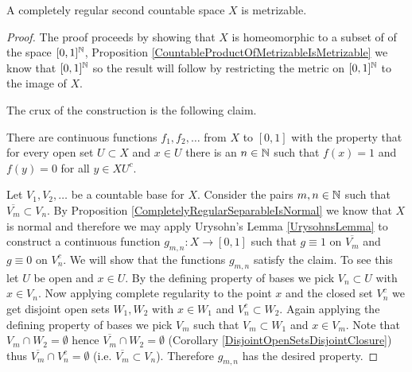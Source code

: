 \begin{thm}\label{UrysohnMetrization}A completely regular second countable space $X$ is metrizable.
\end{thm}
\begin{proof}
The proof proceeds by showing that $X$ is homeomorphic to a subset of of the space $[0,1]^{\mathbb{N}}$,   Proposition \ref{CountableProductOfMetrizableIsMetrizable} we know that $[0,1]^{\mathbb{N}}$
so the result will follow by restricting the metric on $[0,1]^{\mathbb{N}}$ to the image of $X$.

The crux of the construction is the following claim.
\begin{clm}There are continuous functions $f_1, f_2, \dotsc$ from $X$ to $[0,1]$ with the property that for every open set $U \subset X$  and $x \in U$ there is an $n \in \mathbb{N}$ such that $f(x) =1$ and $f(y) = 0$ for all $y \in X U^c$.
\end{clm}
Let $V_1, V_2, \dotsc$ be a countable base for $X$.  Consider the pairs $m,n \in \mathbb{N}$ such that $\overline{V_m} \subset V_n$.  By Proposition \ref{CompletelyRegularSeparableIsNormal} we know that $X$ is normal and therefore we may apply Urysohn's Lemma  \ref{UrysohnsLemma} to construct a continuous function $g_{m,n} : X \to [0,1]$ such that $g \equiv 1$ on $\overline{V_m}$ and $g \equiv 0$ on $V_n^c$.  We will show that the functions $g_{m,n}$ satisfy the claim.   To see this let $U$ be open and $x \in U$.  By the defining property of bases we pick $V_n \subset U$ with $x \in V_n$.  Now applying complete regularity to the point $x$ and the closed set $V_n^c$ we get disjoint open sets $W_1,W_2$ with $x \in W_1$ and $V_n^c \subset W_2$.  Again applying the defining property of bases we pick $V_m$ such that $V_m \subset W_1$ and $x \in V_m$.  Note that $V_m \cap W_2 = \emptyset$ hence $\overline{V_m} \cap W_2 = \emptyset$ (Corollary \ref{DisjointOpenSetsDisjointClosure}) thus $\overline{V_m} \cap V^c_n = \emptyset$ (i.e. $\overline{V_m} \subset V_n$).  Therefore $g_{m,n}$ has the desired property.


\end{proof}
